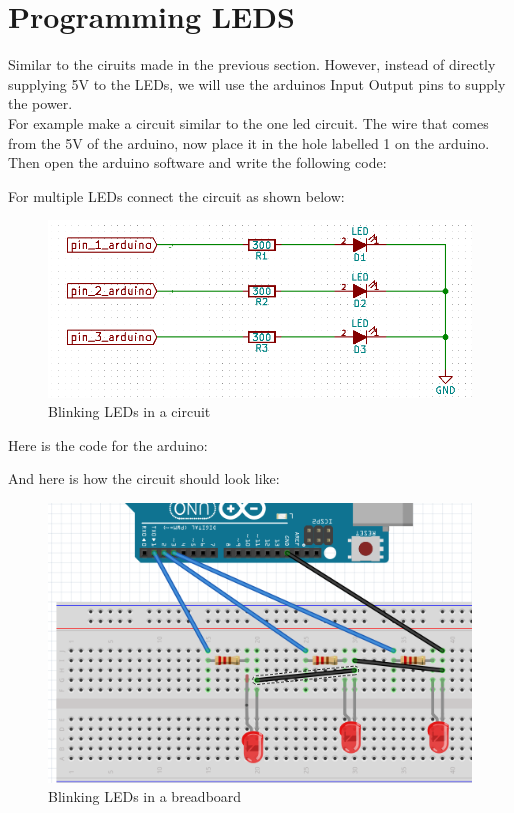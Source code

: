 \documentclass[14pt, oneside]{memoir}
\begin{document}
\section*{Programming LEDS}
Similar to the ciruits made in the previous section. However,
instead of directly supplying 5V to the LEDs, we will use the
arduinos Input Output pins to supply the power.
\\
For example make a circuit similar to the one led circuit. The
wire that comes from the 5V of the arduino, now place it in the
hole labelled 1 on the arduino.
\\
Then open the arduino software and write the following code:


For multiple LEDs connect the circuit as shown below:
\begin{figure}[H]
    \includegraphics[width=\linewidth]{circuit_images/blinking_leds.png}
    \caption{Blinking LEDs in a circuit}
\end{figure}

Here is the code for the arduino:



And here is how the circuit should look like:
\begin{figure}[H]
    \includegraphics[width=0.7\linewidth]{circuit_images/fritz_blinking_leds.png}
    \caption{Blinking LEDs in a breadboard}
\end{figure}
\end{document}
